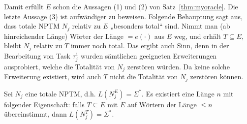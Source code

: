 Damit erfüllt $E$ schon die Aussagen (1) und (2) von Satz~\ref{thm:myoracle}. Die letzte Aussage (3) ist aufwändiger zu beweisen.
Folgende Behauptung sagt aus, dass totale NPTM $N_j$ relativ zu $E$ „besonders total“ sind. Nimmt man (ab hinreichender Länge) Wörter der Länge $=e(\cdot)$ aus $E$ weg, und erhält $T\subseteq E$, bleibt $N_j$ relativ zu $T$ immer noch total. Das ergibt auch Sinn, denn in der Bearbeitung von Task $\tau^1_j$ wurden sämtlichen geeigneten Erweiterungen ausprobiert, welche die Totalität von $N_j$ zerstören würden. Da keine solche Erweiterung existiert, wird auch $T$ nicht die Totalität von $N_j$ zerstören können.

\begin{claim}\label{claim:myoracle-totality}
    Sei $N_j$ eine totale NPTM, d.h. $L(N_j^E)=\Sigma^*$.
    Es existiert eine Länge $n$ mit folgender Eigenschaft: 
    falls $T\subseteq E$ mit $E$ auf Wörtern der Länge $\leq n$ übereinstimmt, dann $L(N_j^T)=\Sigma^*$.
\end{claim}
